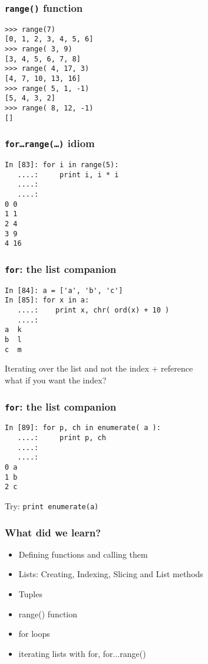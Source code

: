 \documentclass[14pt,compress]{beamer}
\newcounter{time}
\newcommand{\inctime}[1]{\addtocounter{time}{#1}{\tiny \thetime\ m}}
\newcommand{\typ}[1]{\texttt{#1}}
\begin{document}

\begin{frame}[fragile]
  \frametitle{\typ{range()} function}
  \begin{lstlisting}
>>> range(7)
[0, 1, 2, 3, 4, 5, 6]
>>> range( 3, 9)
[3, 4, 5, 6, 7, 8]
>>> range( 4, 17, 3)
[4, 7, 10, 13, 16]
>>> range( 5, 1, -1)
[5, 4, 3, 2]
>>> range( 8, 12, -1)
[]
  \end{lstlisting}
\end{frame}

\begin{frame}[fragile]
  \frametitle{\typ{for\ldots range(\ldots)} idiom}
  \begin{lstlisting}
In [83]: for i in range(5):
   ....:     print i, i * i
   ....:     
   ....:     
0 0
1 1
2 4
3 9
4 16
\end{lstlisting}
\end{frame}

\begin{frame}[fragile]
  \frametitle{\typ{for}: the list companion}
  
  \begin{lstlisting}
In [84]: a = ['a', 'b', 'c']
In [85]: for x in a:
   ....:    print x, chr( ord(x) + 10 )
   ....:
a  k
b  l
c  m
  \end{lstlisting}
  Iterating over the list and not the index + reference\\
  what if you want the index?
\end{frame}

\begin{frame}[fragile]
  \frametitle{\typ{for}: the list companion}
  \begin{lstlisting}
In [89]: for p, ch in enumerate( a ):
   ....:     print p, ch
   ....:     
   ....:     
0 a
1 b
2 c
  \end{lstlisting}
Try: \typ{print enumerate(a)}
\inctime{10}
\end{frame}


\begin{frame}
  \frametitle{What did we learn?}
  \begin{itemize}
    \item Defining functions and calling them
    \item Lists: Creating, Indexing, Slicing and List methods
    \item Tuples
    \item range() function
    \item for loops
    \item iterating lists with for, for...range()
  \end{itemize}
\end{frame}
\end{document}
